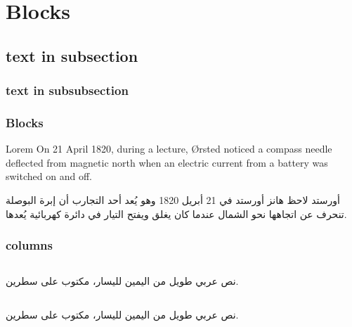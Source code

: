 \documentclass[hyperref=unicode]{beamer}
\begin{document}
\section{Blocks}

\subsection{text in subsection}
\subsubsection{text in subsubsection}

\begin{frame}
\frametitle{Blocks}


\begin{block}{Lorem}
  \foreignlanguage*{nil}{On 21 April 1820, during a lecture, Ørsted
  noticed a compass\cite{Dijkstra1982} needle deflected from magnetic north when an
  electric current from a battery was switched on and off.}
\end{block}


\begin{block}{أورستد}
  لاحظ هانز أورستد في 21 أبريل 1820 وهو يُعد أحد التجارب أن إبرة
  البوصلة تنحرف عن اتجاهها نحو الشمال عندما كان يغلق ويفتح التيار في
  دائرة كهربائية يُعدها.
\end{block}
\end{frame}

\begin{frame}
\frametitle{columns}
\begin{columns}[t]
\begin{column}{5cm}
نص عربي طويل من اليمين لليسار، مكتوب على سطرين.
\end{column}
\begin{column}{5cm}
\end{column}
\end{columns}

\bigskip

\begin{columns}[b]
\begin{column}{5cm}
نص عربي طويل من اليمين لليسار، مكتوب على سطرين.
\end{column}
\begin{column}{5cm}
\end{column}
\end{columns}
\end{frame}
\end{document}
